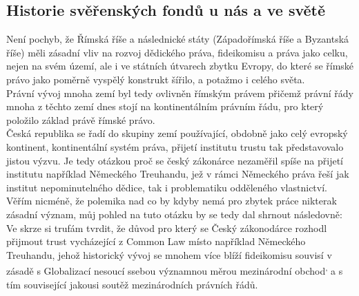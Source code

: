\documentclass{article}
\begin{document}



\subsection{Historie svěřenských fondů u nás a ve světě}

Není pochyb, že Římská říše a následnické státy (Západořímská říše a Byzantská říše) měli zásadní vliv na rozvoj dědického práva, fideikomisu a práva jako celku, nejen na svém území, ale i ve státních útvarech zbytku Evropy, do které se římské právo jako poměrně vyspělý konstrukt šířilo, a potažmo i celého světa.\\

 Právní vývoj mnoha zemí byl tedy ovlivněn římským právem přičemž právní řády mnoha z těchto zemí dnes stojí na kontinentálním právním řádu, pro který položilo základ právě římské právo.\\

 Česká republika se řadí do skupiny zemí používající, obdobně jako celý evropský kontinent, kontinentální systém práva, přijetí institutu trustu tak představovalo jistou výzvu. Je tedy otázkou proč se český zákonárce nezaměřil spíše na přijetí institutu například Německého Treuhandu, jež v rámci Německého práva řeší jak institut nepominutelného dědice, tak i problematiku odděleného vlastnictví. Věřím nicméně, že polemika nad co by kdyby nemá pro zbytek práce nikterak zásadní význam, můj pohled na tuto otázku by se tedy dal shrnout následovně: Ve skrze si trufám tvrdit, že důvod pro který se Český zákonodárce rozhodl přijmout trust vycházející z Common Law místo například Německého Treuhandu, jehož historický vývoj se mnohem více blíží fideikomisu souvisí v zásadě s Globalizací nesoucí ssebou významnou měrou mezinárodní obchod\textsuperscript{,} a s tím související jakousi soutěž mezinárodních právních řádů.\\
 
\end{document}
